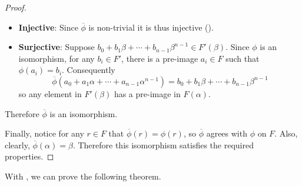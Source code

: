 \begin{proof}
\begin{itemize}
        \item \textbf{Injective}: Since $\overline{\phi}$ is non-trivial it is thus injective ().

        \item \textbf{Surjective}: Suppose $b_0 + b_1\beta + \cdots + b_{n-1}\beta^{n-1} \in F'(\beta)$. Since $\phi$ is an isomorphism, for any $b_i \in F'$, there is a pre-image $a_i \in F$ such that $\phi(a_i) = b_i$. Consequently
        \[
            \overline{\phi}\left(a_0 + a_1\alpha + \cdots + a_{n-1}\alpha^{n-1}\right) = b_0 + b_1\beta + \cdots + b_{n-1}\beta^{n-1}
        \]
        so any element in $F'(\beta)$ has a pre-image in $F(\alpha)$.
    \end{itemize}
    Therefore $\overline{\phi}$ is an isomorphism.

    Finally, notice for any $r \in F$ that $\overline{\phi}(r) = \phi(r)$, so $\overline{\phi}$ agrees with $\phi$ on $F$. Also, clearly, $\overline{\phi}(\alpha) = \beta$. Therefore this isomorphism satisfies the required properties.
\end{proof}

With , we can prove the following theorem.

